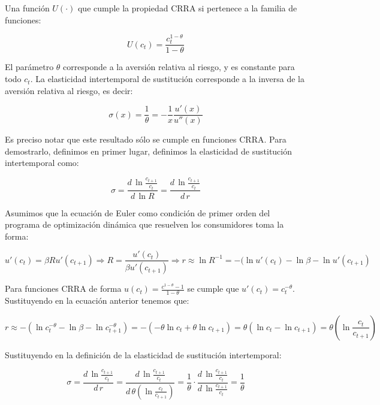 \documentclass{nuevotema}
\begin{document}

Una función $U(\cdot)$ que cumple la propiedad CRRA si pertenece a la familia de funciones:

\begin{equation}
U(c_t) = \frac{c_t^{1-\theta}}{1-\theta}
\end{equation}

El parámetro $\theta$ corresponde a la aversión relativa al riesgo, y es constante para todo $c_t$. La elasticidad intertemporal de sustitución corresponde a la inversa de la aversión relativa al riesgo, es decir:

\begin{equation}
\sigma(x) = \frac{1}{\theta} = - \frac{1}{x} \frac{u'(x)}{u''(x)}
\end{equation}

Es preciso notar que este resultado sólo se cumple en funciones CRRA. Para demostrarlo, definimos en primer lugar, definimos la elasticidad de sustitución intertemporal como:

\begin{equation}
\sigma = \frac{d \, \ln \frac{c_{t+1}}{c_t} }{ d \, \ln R} = \frac{d \, \ln \frac{c_{t+1}}{c_t} }{ d \, r}
\end{equation}

Asumimos que la ecuación de Euler como condición de primer orden del programa de optimización dinámica que resuelven los consumidores toma la forma:

\begin{equation}
u'(c_t) = \beta R u'(c_{t+1}) \Rightarrow R = \frac{u'(c_t)}{\beta u'(c_{t+1})} \Rightarrow r \approx \ln R^{-1} =  -(\ln u'(c_t) - \ln \beta - \ln u'(c_{t+1})
\end{equation}

Para funciones CRRA de forma $u(c_t) = \frac{c^{1-\theta}-1}{1-\theta}$ se cumple que $u'(c_t) = c_t^{-\theta}$. Sustituyendo en la ecuación anterior tenemos que:

\begin{equation}
r \approx -(\ln c_t^{-\theta} - \ln \beta - \ln c_{t+1}^{-\theta}) = - (-\theta \ln c_t + \theta \ln c_{t+1}) = \theta (\ln c_t - \ln c_{t+1}) = \theta  \left( \ln \frac{c_t}{c_{t+1}} \right)
\end{equation}

Sustituyendo en la definición de la elasticidad de sustitución intertemporal:

\begin{equation}
\sigma = \frac{d \, \ln \frac{c_{t+1}}{c_t} }{ d \, r} = \frac{d \, \ln \frac{c_{t+1}}{c_t} }{ d \,  \theta  \left( \ln \frac{c_t}{c_{t+1}} \right) } = \frac{1}{\theta} \cdot \frac{d \, \ln \frac{c_{t+1}}{c_t} }{d \, \ln \frac{c_{t+1}}{c_t} } = \frac{1}{\theta}
\end{equation}
\end{document}
